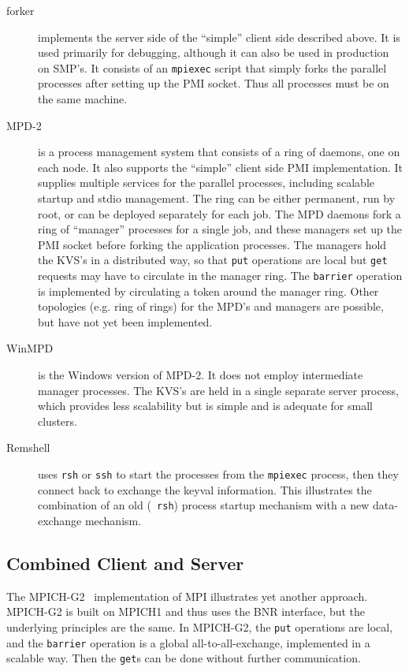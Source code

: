 \documentclass[11pt]{article}
\begin{document}
\begin{description}
\item[forker] implements the server side of the ``simple'' client side
  described above.  It is used primarily for debugging, although it can
  also be used in production on SMP's.  It consists of an {\tt mpiexec}
  script that simply forks the parallel processes after setting up the
  PMI socket.  Thus all processes must be on the same machine.
\item[MPD-2] is a process management system that consists of a ring of
  daemons, one on each node.  It also supports the ``simple'' client
  side PMI implementation.  It supplies multiple services for the
  parallel processes, including scalable startup and stdio management.
  The ring can be either permanent, run by root, or can be deployed
  separately for each job.  The MPD daemons fork a ring of ``manager''
  processes for a single job, and these managers set up the PMI socket
  before forking the application processes.  The managers hold the KVS's
  in a distributed way, so that {\tt put} operations are local but {\tt get}
  requests may have to circulate in the manager ring.  The {\tt barrier}
  operation is implemented by circulating a token around the manager
  ring.  Other topologies (e.g. ring of rings) for the MPD's and
  managers are possible, but have not yet been implemented.
\item[WinMPD] is the Windows version of MPD-2.  It does not employ
  intermediate manager processes.  The KVS's are held in a single
  separate server process, which provides less scalability but is
  simple and is adequate for small clusters.
\item[Remshell] uses {\tt rsh} or {\tt ssh} to start the processes from
  the {\tt mpiexec} process, then they connect back to exchange the
  keyval information.  This illustrates the combination of an old ({\tt
    rsh}) process startup mechanism with a new data-exchange mechanism.
\end{description}

\subsection{Combined Client and Server}
\label{sec:combined}

The MPICH-G2~\cite{karonis02:mpich-g2} implementation of MPI illustrates
yet another approach.  MPICH-G2 is built on MPICH1 and thus uses the BNR
interface, but the underlying principles are the same.  In MPICH-G2, the
{\tt put} operations are local, and the {\tt barrier} operation is a
global all-to-all-exchange, implemented in a scalable way.  Then the
{\tt get}s can be done without further communication. 
\end{document}
